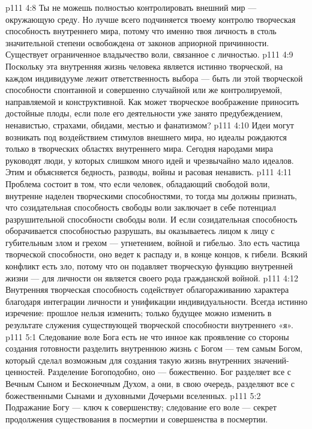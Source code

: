 \vs p111 4:8 \pc Ты не можешь полностью контролировать внешний мир --- окружающую среду. Но лучше всего подчиняется твоему контролю творческая способность внутреннего мира, потому что именно твоя личность в столь значительной степени освобождена от законов априорной причинности. Существует ограниченное владычество воли, связанное с личностью.
\vs p111 4:9 Поскольку эта внутренняя жизнь человека является истинно творческой, на каждом индивидууме лежит ответственность выбора --- быть ли этой творческой способности спонтанной и совершенно случайной или же контролируемой, направляемой и конструктивной. Как может творческое воображение приносить достойные плоды, если поле его деятельности уже занято предубеждением, ненавистью, страхами, обидами, местью и фанатизмом?
\vs p111 4:10 Идеи могут возникать под воздействием стимулов внешнего мира, но идеалы рождаются только в творческих областях внутреннего мира. Сегодня народами мира руководят люди, у которых слишком много идей и чрезвычайно мало идеалов. Этим и объясняется бедность, разводы, войны и расовая ненависть.
\vs p111 4:11 Проблема состоит в том, что если человек, обладающий свободой воли, внутренне наделен творческими способностями, то тогда мы должны признать, что созидательная способность свободы воли заключает в себе потенциал разрушительной способности свободы воли. И если созидательная способность оборачивается способностью разрушать, вы оказываетесь лицом к лицу с губительным злом и грехом --- угнетением, войной и гибелью. Зло есть частица творческой способности, оно ведет к распаду и, в конце концов, к гибели. Всякий конфликт есть зло, потому что он подавляет творческую функцию внутренней жизни --- для личности он является своего рода гражданской войной.
\vs p111 4:12 \pc Внутренняя творческая способность содействует облагораживанию характера благодаря интеграции личности и унификации индивидуальности. Всегда истинно изречение: прошлое нельзя изменить; только будущее можно изменить в результате служения существующей творческой способности внутреннего «я».
\vs p111 5:1 Следование воле Бога есть не что инное как проявление со стороны создания готовности разделить внутреннюю жизнь с Богом --- тем самым Богом, который сделал возможным для создания такую жизнь внутренних значений\hyp{}ценностей. Разделение Богоподобно, оно --- божественно. Бог разделяет все с Вечным Сыном и Бесконечным Духом, а они, в свою очередь, разделяют все с божественными Сынами и духовными Дочерьми вселенных.
\vs p111 5:2 Подражание Богу --- ключ к совершенству; следование его воле --- секрет продолжения существования в посмертии и совершенства в посмертии.
